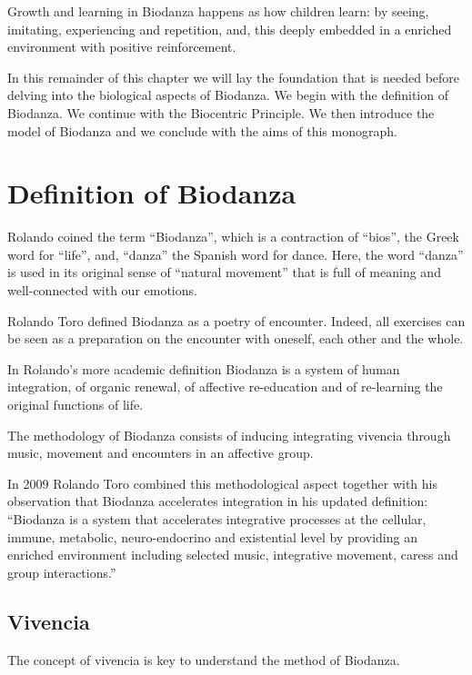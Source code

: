 \documentclass[
  11pt,
]{book}
\begin{document}
Growth and learning in Biodanza happens as how children learn: by seeing, imitating, experiencing and repetition, and, this deeply embedded in a enriched environment with positive reinforcement.

In this remainder of this chapter we will lay the foundation that is needed before delving into the biological aspects of Biodanza. We begin with the definition of Biodanza. We continue with the Biocentric Principle. We then introduce the model of Biodanza and we conclude with the aims of this monograph.

\hypertarget{definition-of-biodanza}{%
\section{Definition of Biodanza}\label{definition-of-biodanza}}

Rolando coined the term ``Biodanza'', which is a contraction of ``bios'', the Greek word for ``life'', and, ``danza'' the Spanish word for dance. Here, the word ``danza'' is used in its original sense of ``natural movement'' that is full of meaning and well-connected with our emotions.

Rolando Toro defined Biodanza as a poetry of encounter. Indeed, all exercises can be seen as a preparation on the encounter with oneself, each other and the whole.

In Rolando's more academic definition Biodanza is a system of human integration, of organic renewal, of affective re-education and of re-learning the original functions of life.

The methodology of Biodanza consists of inducing integrating vivencia through music, movement and encounters in an affective group.

In 2009 Rolando Toro combined this methodological aspect together with his observation that Biodanza accelerates integration in his updated definition: ``Biodanza is a system that accelerates integrative processes at the cellular, immune, metabolic, neuro-endocrino and existential level by providing an enriched environment including selected music, integrative movement, caress and group interactions.''

\hypertarget{vivencia}{%
\subsection{Vivencia}\label{vivencia}}

The concept of vivencia is key to understand the method of Biodanza.
\end{document}
